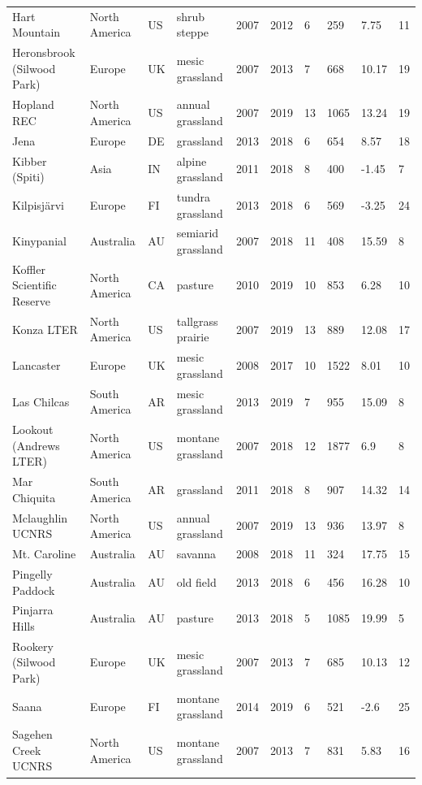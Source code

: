 \documentclass[twoside,12pt,final]{ucthesis-CA2012}
\begin{document}
\begin{ucmainmatter}
\begin{table}[ht]
{\begin{tabular}{llllllllll}
  Hart Mountain & North America & US & shrub steppe & 2007 & 2012 & 6 & 259 & 7.75 & 11 \\ 
  Heronsbrook (Silwood Park) & Europe & UK & mesic grassland & 2007 & 2013 & 7 & 668 & 10.17 & 19 \\ 
  Hopland REC & North America & US & annual grassland & 2007 & 2019 & 13 & 1065 & 13.24 & 19 \\ 
  Jena & Europe & DE & grassland & 2013 & 2018 & 6 & 654 & 8.57 & 18 \\ 
  Kibber (Spiti) & Asia & IN & alpine grassland & 2011 & 2018 & 8 & 400 & -1.45 & 7 \\ 
  Kilpisjärvi & Europe & FI & tundra grassland & 2013 & 2018 & 6 & 569 & -3.25 & 24 \\ 
  Kinypanial & Australia & AU & semiarid grassland & 2007 & 2018 & 11 & 408 & 15.59 & 8 \\ 
  Koffler Scientific Reserve & North America & CA & pasture & 2010 & 2019 & 10 & 853 & 6.28 & 10 \\ 
  Konza LTER & North America & US & tallgrass prairie & 2007 & 2019 & 13 & 889 & 12.08 & 17 \\ 
  Lancaster & Europe & UK & mesic grassland & 2008 & 2017 & 10 & 1522 & 8.01 & 10 \\ 
  Las Chilcas & South America & AR & mesic grassland & 2013 & 2019 & 7 & 955 & 15.09 & 8 \\ 
  Lookout (Andrews LTER) & North America & US & montane grassland & 2007 & 2018 & 12 & 1877 & 6.9 & 8 \\ 
  Mar Chiquita & South America & AR & grassland & 2011 & 2018 & 8 & 907 & 14.32 & 14 \\ 
  Mclaughlin UCNRS & North America & US & annual grassland & 2007 & 2019 & 13 & 936 & 13.97 & 8 \\ 
  Mt. Caroline & Australia & AU & savanna & 2008 & 2018 & 11 & 324 & 17.75 & 15 \\ 
  Pingelly Paddock & Australia & AU & old field & 2013 & 2018 & 6 & 456 & 16.28 & 10 \\ 
  Pinjarra Hills & Australia & AU & pasture & 2013 & 2018 & 5 & 1085 & 19.99 & 5 \\ 
  Rookery (Silwood Park) & Europe & UK & mesic grassland & 2007 & 2013 & 7 & 685 & 10.13 & 12 \\ 
  Saana & Europe & FI & montane grassland & 2014 & 2019 & 6 & 521 & -2.6 & 25 \\ 
  Sagehen Creek UCNRS & North America & US & montane grassland & 2007 & 2013 & 7 & 831 & 5.83 & 16 \\ 

\end{tabular}}
\end{table}
\end{ucmainmatter}
\end{document}
